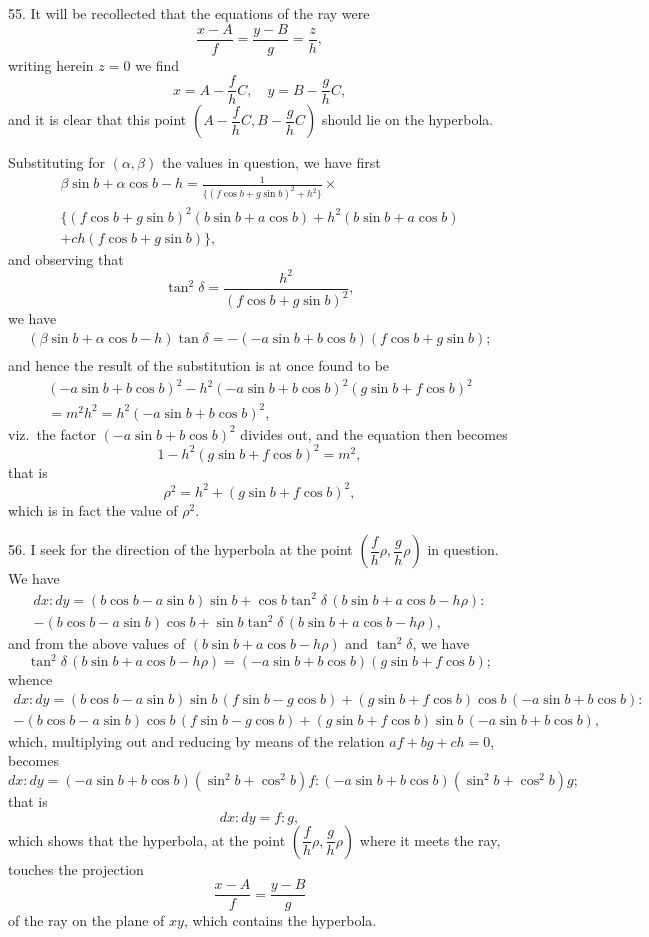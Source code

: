 \documentclass[11pt,a4paper]{article}
\theoremstyle{definition}
\begin{document}
55. It will be recollected that the equations of the ray were
\[
\frac{x-A}{f} = \frac{y-B}{g} = \frac{z}{h},
\]
writing herein $z=0$ we find
\[
x = A - \frac{f}{h}C, \quad y = B - \frac{g}{h}C,
\]
and it is clear that this point $\left(A-\dfrac{f}{h}C, B-\dfrac{g}{h}C\right)$ should lie on the hyperbola.

Substituting for $(\alpha, \beta)$ the values in question, we have first
\begin{multline*}
\beta\sin b + \alpha\cos b - h =
\frac{1}{\{(f\cos b + g\sin b)^2 + h^2\}}\times\\
\{(f\cos b + g\sin b)^2(b\sin b + a\cos b) + h^2(b\sin b + a\cos b)\\
+ ch(f\cos b + g\sin b)\},
\end{multline*}
and observing that
\[
\tan^2\delta = \frac{h^2}{(f\cos b + g\sin b)^2},
\]
we have
\begin{multline*}
(\beta\sin b + \alpha\cos b - h)\tan\delta =
-(-a\sin b + b\cos b)(f\cos b + g\sin b);\\
\end{multline*}
and hence the result of the substitution is at once found to be
\begin{multline*}
(-a\sin b + b\cos b)^2 - h^2(-a\sin b + b\cos b)^2(g\sin b + f\cos b)^2\\
= m^2h^2 = h^2(-a\sin b + b\cos b)^2,
\end{multline*}
viz.~the factor $(-a\sin b + b\cos b)^2$ divides out, and the equation then becomes
\[
1 - h^2(g\sin b + f\cos b)^2 = m^2,
\]
that is
\[
\rho^2 = h^2 + (g\sin b + f\cos b)^2,
\]
which is in fact the value of $\rho^2$.

56. I seek for the direction of the hyperbola at the point $\left(\dfrac{f}{h}\rho, \dfrac{g}{h}\rho\right)$ in question.
We have
\begin{multline*}
dx : dy = (b\cos b - a\sin b)\sin b + \cos b\tan^2\delta\,(b\sin b + a\cos b - h\rho) :\\
- (b\cos b - a\sin b)\cos b + \sin b\tan^2\delta\,(b\sin b + a\cos b - h\rho),
\end{multline*}
and from the above values of $(b\sin b + a\cos b - h\rho)$ and $\tan^2\delta$, we have
\[
\tan^2\delta\,(b\sin b + a\cos b - h\rho) = (-a\sin b + b\cos b)(g\sin b + f\cos b);
\]
whence
\begin{multline*}
dx : dy = (b\cos b - a\sin b)\sin b\,(f\sin b - g\cos b) + (g\sin b + f\cos b)\cos b\,(-a\sin b + b\cos b) :\\
- (b\cos b - a\sin b)\cos b\,(f\sin b - g\cos b) + (g\sin b + f\cos b)\sin b\,(-a\sin b + b\cos b),
\end{multline*}
which, multiplying out and reducing by means of the relation $af+bg+ch=0$, becomes
\[
dx : dy = (-a\sin b + b\cos b)(\sin^2 b + \cos^2 b)f : (-a\sin b + b\cos b)(\sin^2 b + \cos^2 b)g;
\]
that is
\[
dx : dy = f : g,
\]
which shows that the hyperbola, at the point $\left(\dfrac{f}{h}\rho, \dfrac{g}{h}\rho\right)$ where it meets the ray, touches
the projection
\[
\frac{x-A}{f} = \frac{y-B}{g}
\]
of the ray on the plane of $xy$, which contains the hyperbola.
\end{document}
